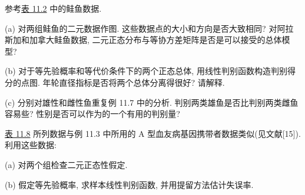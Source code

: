 \quad 参考\hyperref[tab:11.2]{表 11.2} 中的鲑鱼数据.

(a) 对两组鲑鱼的二元数据作图. 这些数据点的大小和方向是否大致相同? 对阿拉斯加和加拿大鲑鱼数据, 二元正态分布与等协方差矩阵是否是可以接受的总体模型?

(b) 对于等先验概率和等代价条件下的两个正态总体, 用线性判别函数构造判别得分的点图. 年轮直径指标是否将两个总体分离得很好? 请解释.

(c) 分别对雄性和雌性鱼重复例 11.7 中的分析. 判别两类雄鱼是否比判别两类雌鱼容易些? 性别是否可以作为的一个有用的判别量?

\quad \hyperref[tab:11.8]{表 11.8} 所列数据与例 11.3 中所用的 A 型血友病基因携带者数据类似(见文献[15]). 利用这些数据:

(a) 对两个组检查二元正态性假定.

(b) 假定等先验概率, 求样本线性判别函数, 并用提留方法估计失误率.
